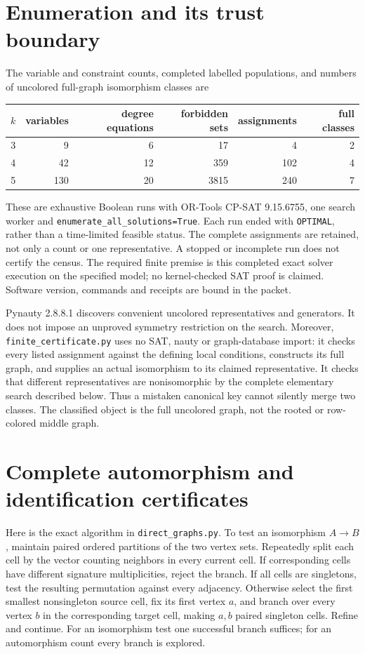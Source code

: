 \documentclass[11pt,a4paper]{article}
\begin{document}
\section{Enumeration and its trust boundary}
The variable and constraint counts, completed labelled populations, and
numbers of uncolored full-graph isomorphism classes are
\begin{center}
\begin{tabular}{rrrrrr}
\toprule
$k$&variables&degree equations&forbidden sets&assignments&full classes\\
\midrule
3&9&6&17&4&2\\
4&42&12&359&102&4\\
5&130&20&3815&240&7\\
\bottomrule
\end{tabular}
\end{center}
These are exhaustive Boolean runs with OR-Tools CP-SAT 9.15.6755, one search
worker and \texttt{enumerate\_all\_solutions=True}. Each run ended with
\texttt{OPTIMAL}, rather than a time-limited feasible status. The complete
assignments are retained, not only a count or one representative. A stopped
or incomplete run does not certify the census. The required finite premise
is this completed exact solver execution on the specified model; no
kernel-checked SAT proof is claimed. Software version, commands and receipts
are bound in the packet.

Pynauty 2.8.8.1 discovers convenient uncolored representatives and generators.
It does not impose an unproved symmetry restriction on the search. Moreover,
\texttt{finite\_certificate.py} uses no SAT, nauty or graph-database import:
it checks every listed assignment against the defining local conditions,
constructs its full graph, and supplies an actual isomorphism to its claimed
representative. It checks that different representatives are nonisomorphic
by the complete elementary search described below. Thus a mistaken
canonical key cannot silently merge two classes. The classified object is
the full uncolored graph, not the rooted or row-colored middle graph.

\section{Complete automorphism and identification certificates}
Here is the exact algorithm in \texttt{direct\_graphs.py}. To test an
isomorphism $A\to B$, maintain paired ordered partitions of the two vertex
sets. Repeatedly split each cell by the vector counting neighbors in every
current cell. If corresponding cells have different signature multiplicities,
reject the branch. If all cells are singletons, test the resulting permutation
against every adjacency. Otherwise select the first smallest nonsingleton
source cell, fix its first vertex $a$, and branch over every vertex $b$ in
the corresponding target cell, making $a,b$ paired singleton cells. Refine
and continue. For an isomorphism test one successful branch suffices; for an
automorphism count every branch is explored.
\end{document}
